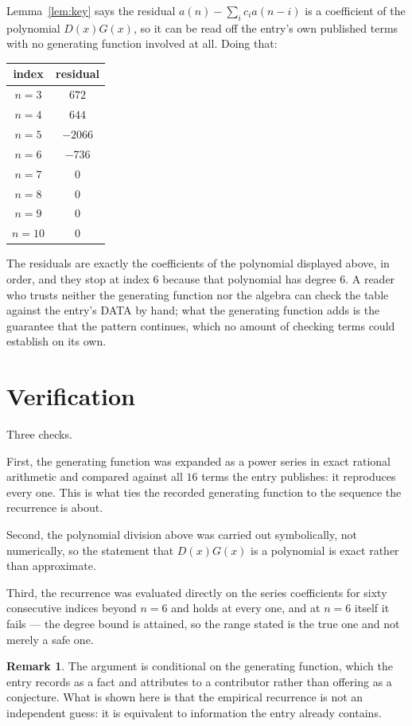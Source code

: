 \documentclass[11pt,a4paper]{article}
\theoremstyle{plain}
\theoremstyle{definition}
\newtheorem{remark}[theorem]{Remark}
\begin{document}
Lemma~\ref{lem:key} says the residual $a(n)-\sum_ic_ia(n-i)$ is a coefficient of the
polynomial $D(x)G(x)$, so it can be read off the entry's own published terms with no
generating function involved at all. Doing that:
\begin{center}
\begin{tabular}{cc}
index & residual \\ \hline
$n=3$ & $672$ \\
$n=4$ & $644$ \\
$n=5$ & $-2066$ \\
$n=6$ & $-736$ \\
$n=7$ & $0$ \\
$n=8$ & $0$ \\
$n=9$ & $0$ \\
$n=10$ & $0$
\end{tabular}
\end{center}
The residuals are exactly the coefficients of the polynomial displayed above, in order, and
they stop at index $6$ because that polynomial has degree $6$. A reader who trusts
neither the generating function nor the algebra can check the table against the entry's DATA
by hand; what the generating function adds is the guarantee that the pattern continues, which
no amount of checking terms could establish on its own.

\section{Verification}

Three checks.

First, the generating function was expanded as a power series in exact rational arithmetic and
compared against all $16$ terms the entry publishes: it reproduces every one. This is
what ties the recorded generating function to the sequence the recurrence is about.

Second, the polynomial division above was carried out symbolically, not numerically, so the
statement that $D(x)G(x)$ is a polynomial is exact rather than approximate.

Third, the recurrence was evaluated directly on the series coefficients for sixty consecutive
indices beyond $n=6$ and holds at every one, and at $n=6$ itself it fails --- the
degree bound is attained, so the range stated is the true one and not merely a safe one.

\begin{remark}
The argument is conditional on the generating function, which the entry records as a fact and
attributes to a contributor rather than offering as a conjecture. What is shown here is that
the empirical recurrence is not an independent guess: it is equivalent to information the
entry already contains.
\end{remark}
\end{document}
